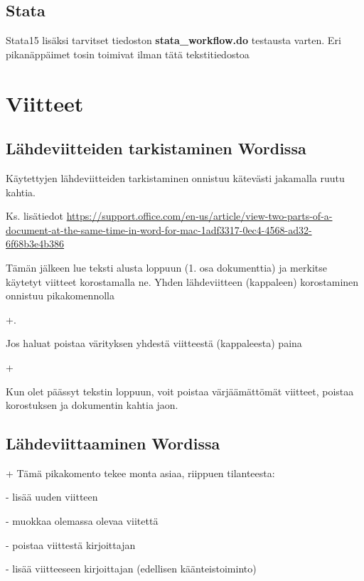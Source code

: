 \documentclass[a5paper,9pt]{scrartcl}
\begin{document}
    \subsection{Stata}
    Stata15 lisäksi tarvitset tiedoston \textbf{stata\_workflow.do} testausta varten. Eri pikanäppäimet tosin toimivat ilman tätä tekstitiedostoa

    
    \section{Viitteet}
    \subsection{Lähdeviitteiden tarkistaminen Wordissa}
    Käytettyjen lähdeviitteiden tarkistaminen onnistuu kätevästi jakamalla ruutu kahtia.
    
    
    
    Ks. lisätiedot \url{https://support.office.com/en-us/article/view-two-parts-of-a-document-at-the-same-time-in-word-for-mac-1adf3317-0ec4-4568-ad32-6f68b3e4b386}
    
    Tämän jälkeen lue teksti alusta loppuun (1. osa dokumenttia) ja merkitse käytetyt viitteet korostamalla ne. Yhden lähdeviitteen (kappaleen) korostaminen onnistuu pikakomennolla
    
    +. 
    
    Jos haluat poistaa värityksen yhdestä viitteestä (kappaleesta) paina
    
     +
     
    Kun olet päässyt tekstin loppuun, voit poistaa värjäämättömät viitteet, poistaa korostuksen ja dokumentin kahtia jaon.
    
    \subsection{Lähdeviittaaminen Wordissa}
    
    +
    Tämä pikakomento tekee monta asiaa, riippuen tilanteesta:
    
    - lisää uuden viitteen
    
    - muokkaa olemassa olevaa viitettä
    
    - poistaa viittestä kirjoittajan
    
    - lisää viitteeseen kirjoittajan (edellisen käänteistoiminto)
    
\end{document}
